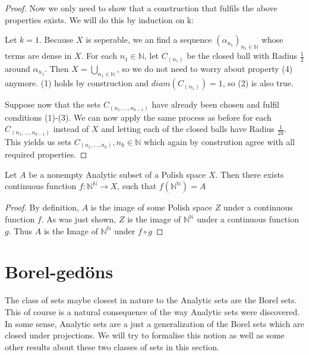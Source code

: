 \documentclass[10pt, a4paper, titlepage]{article}
\numberwithin{equation}{section}
\begin{document}
\begin{proof}
Now we only need to show that a construction that fulfils the above properties exists.
We will do this by induction on k:

Let $k=1$. Because  $X$ is seperable, we an find a sequence  $\left( \alpha_{n_1} \right)_{n_1 \in \mathbb{N}} $ whose terms are dense in $X$. 
For each  $n_1 \in  \mathbb{N}$, let $C_{\left( n_1 \right) }$ be the closed ball with Radius $\frac{1}{2}$ around $\alpha_{n_1}$.
Then $X = \bigcup_{n_1 \in  \mathbb{N}}$, so we do not need to worry about property (4) anymore. 
(1) holds by construction and $diam \left( C_{\left( n_1 \right) } \right) = 1$, so (2) is also true. 

Suppose now that the sets $C_{\left( n_1,\ldots,n_{k-1} \right) }$ have already been chosen and fulfil conditions (1)-(3).
We can now apply the same process as before for each $C_{\left( n_1,\ldots,n_{k-1} \right) }$ instead of $X$ and letting each of the closed balls have Radius  $\frac{1}{2k}$. This yields us sets $C_{\left( n_1,\ldots,n_k \right) }, n_k \in \mathbb{N}$ which again by constrution agree with all required properties. 
\end{proof}









\begin{theorem}
	Let $A$ be a nonempty Analytic subset of a Polish space $X$. Then there exists continuous function $f: \mathbb{N}^{\mathbb{N}} \to X$, such that $f\left( \mathbb{N}^{\mathbb{N}} \right) = A$
\end{theorem}
\begin{proof}
	By definition, $A$ is the image of some Polish space $Z$ under a continuous function $f$. As was just shown,  $Z$ is the image of  $\mathbb{N}^\mathbb{N}$ under a continuous function $g$.
	Thus  $A$ is the Image of  $\mathbb{N}^\mathbb{N}$ under $f \circ g$
\end{proof}








\section{Borel-gedöns}
The class of sets maybe closest in nature to the Analytic sets are the Borel sets. 
This of course is a natural consequence of the way Analytic sets were discovered. 
In some sense, Analytic sets are a just a generalization of the Borel sets which are closed under projections. 
We will try to formalise this notion as well as some other results about these two classes of sets in this section.
\end{document}

